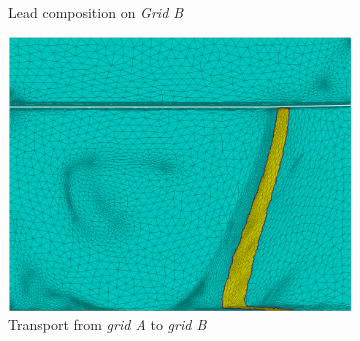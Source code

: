 \begin{figure}[htbp]
\begin{subfigure}[t]{0.4\textwidth}
  \caption{Lead composition on \emph{Grid B}}
    \label{fig:1200s_compobis}
  \end{subfigure}
   \vspace{5mm}
  \begin{subfigure}[t]{0.4\textwidth}
    \centering
  \includegraphics[width=\textwidth]{Chapter5/Graphics/2d/processed/1200s_unmask.png}
  \caption{Transport from \emph{grid A} to \emph{grid B}}
    \label{fig:1200s_unmask}
  \end{subfigure}
  \begin{subfigure}[t]{0.15\textwidth}
    \centering

\end{subfigure}
\end{figure}
